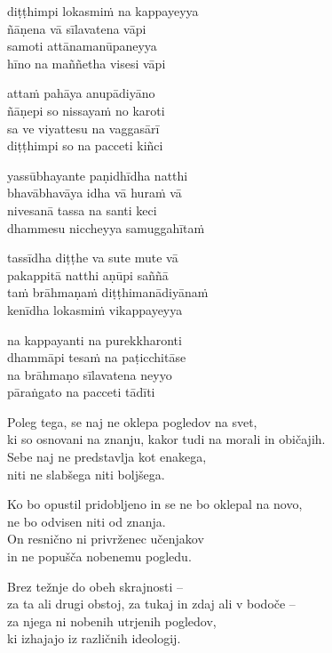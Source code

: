 
\clearpage

diṭṭhimpi lokasmiṁ na kappayeyya\\
ñāṇena vā sīlavatena vāpi\\
samoti attānamanūpaneyya\\
hīno na maññetha visesi vāpi

attaṁ pahāya anupādiyāno\\
ñāṇepi so nissayaṁ no karoti\\
sa ve viyattesu na vaggasārī\\
diṭṭhimpi so na pacceti kiñci

yassūbhayante paṇidhīdha natthi\\
bhavābhavāya idha vā huraṁ vā\\
nivesanā tassa na santi keci\\
dhammesu niccheyya samuggahītaṁ

tassīdha diṭṭhe va sute mute vā\\
pakappitā natthi aṇūpi saññā\\
taṁ brāhmaṇaṁ diṭṭhimanādiyānaṁ\\
kenīdha lokasmiṁ vikappayeyya

na kappayanti na purekkharonti\\
dhammāpi tesaṁ na paṭicchitāse\\
na brāhmaṇo sīlavatena neyyo\\
pāraṅgato na pacceti tādīti


\clearpage

Poleg tega, se naj ne oklepa pogledov na svet,\\
ki so osnovani na znanju, kakor tudi na morali in običajih.\\
Sebe naj ne predstavlja kot enakega,\\
niti ne slabšega niti boljšega.

Ko bo opustil pridobljeno in se ne bo oklepal na novo,\\
ne bo odvisen niti od znanja.\\
On resnično ni privrženec učenjakov\\
in ne popušča nobenemu pogledu.

Brez težnje do obeh skrajnosti --\\
za ta ali drugi obstoj, za tukaj in zdaj ali v bodoče --\\
za njega ni nobenih utrjenih pogledov,\\
ki izhajajo iz različnih ideologij.

